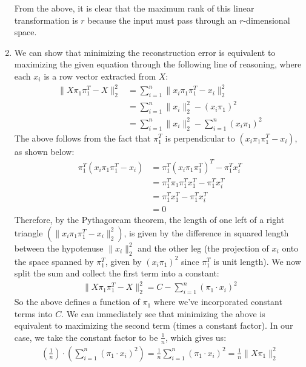 \documentclass{harvardml}
\theoremstyle{plain}
\begin{document}
\begin{enumerate}[label=(\alph*)]
From the above, it is clear that the maximum rank of this linear transformation is $r$ because the input must pass through an $r$-dimensional space.
\item
We can show that minimizing the reconstruction error is equivalent to maximizing the given equation through the following line of reasoning, where each $x_i$ is a row vector extracted from $X$:
\begin{align*}
\| X\pi_1\pi_1^T - X \|_2^2 &= \sum_{i=1}^{n} \|x_i\pi_1\pi_1^T - x_i \|_2^2 \\
&= \sum_{i=1}^n \|x_i \|_2^2 - (x_i\pi_1)^2 \\
&= \sum_{i=1}^n \| x_i \|_2^2 - \sum_{i=1}^n (x_i \pi_1)^2
\end{align*}
The above follows from the fact that $\pi_1^T$ is perpendicular to $(x_i\pi_1\pi_1^T - x_i)$, as shown below:
\begin{align*}
\pi_1^T(x_i \pi_1 \pi_1^T - x_i) &= \pi_1^T(x_i \pi_1 \pi_1^T)^T - \pi_1^T x_i^T \\
&= \pi_1^T\pi_1\pi_1^Tx_1^T - \pi_1^Tx_i^T \\
&= \pi_1^T x_1^T - \pi_1^T x_i^T \tag{$\pi_1^T\pi_1 = 0$} \\
&= 0
\end{align*}
Therefore, by the Pythagoream theorem, the length of one left of a right triangle $( \|x_i\pi_1\pi_1^T - x_i \|_2^2 )$, is given by the difference in squared length between the hypotenuse $\| x_i\|_2^2$ and the other leg (the projection of $x_i$ onto the space spanned by $\pi_1^T$, given by $(x_i \pi_1)^2$ since $\pi_1^T$ is unit length). We now split the sum and collect the first term into a constant:
\begin{align*}
\| X\pi_1\pi_1^T - X \|_2^2  = C - \sum_{i=1}^n (\pi_1 \cdot x_i)^2
\end{align*}
So the above defines a function of $\pi_1$ where we've incorporated constant terms into $C$. We can immediately see that minimizing the above is equivalent to maximizing the second term (times a constant factor). In our case, we take the constant factor to be $\frac{1}{n}$, which gives us:
\begin{align*}
\left( \frac{1}{n} \right)\cdot \left(\sum_{i=1}^n (\pi_1 \cdot x_i)^2 \right) = \frac{1}{n} \sum_{i=1}^n (\pi_1 \cdot x_i )^2 = \frac{1}{n} \| X\pi_1 \|_2^2
\end{align*}


\end{enumerate}
\end{document}
